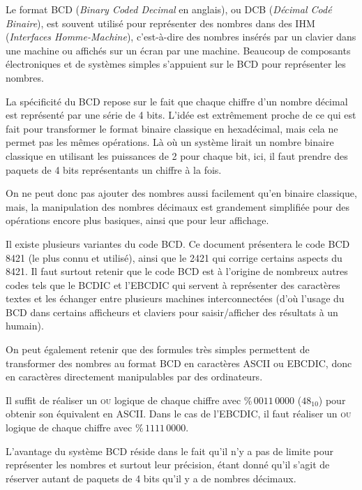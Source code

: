 \documentclass[11pt,a4paper]{article}
\begin{document}
\bigskip

Le format BCD (\textit{Binary Coded Decimal} en anglais), ou DCB (\textit{Décimal Codé Binaire}), est souvent utilisé pour représenter des nombres dans des IHM (\textit{Interfaces Homme-Machine}), c'est-à-dire des nombres insérés par un clavier dans une machine ou affichés sur un écran par une machine.
Beaucoup de composants électroniques et de systèmes simples s'appuient sur le BCD pour représenter les nombres.

\medskip

La spécificité du BCD repose sur le fait que chaque chiffre d'un nombre décimal est représenté par une série de 4 bits.
L'idée est extrêmement proche de ce qui est fait pour transformer le format binaire classique en hexadécimal, mais cela ne permet pas les mêmes opérations.
Là où un système lirait un nombre binaire classique en utilisant les puissances de 2 pour chaque bit, ici, il faut prendre des paquets de 4 bits représentants un chiffre à la fois.

On ne peut donc pas ajouter des nombres aussi facilement qu'en binaire classique, mais, la manipulation des nombres décimaux est grandement simplifiée pour des opérations encore plus basiques, ainsi que pour leur affichage.

\bigskip

Il existe plusieurs variantes du code BCD.
Ce document présentera le code BCD 8421 (le plus connu et utilisé), ainsi que le 2421 qui corrige certains aspects du 8421.
Il faut surtout retenir que le code BCD est à l'origine de nombreux autres codes tels que le BCDIC et l'EBCDIC qui servent à représenter des caractères textes et les échanger entre plusieurs machines interconnectées (d'où l'usage du BCD dans certains afficheurs et claviers pour saisir/afficher des résultats à un humain).

\medskip

On peut également retenir que des formules très simples permettent de transformer des nombres au format BCD en caractères ASCII ou EBCDIC, donc en caractères directement manipulables par des ordinateurs.

Il suffit de réaliser un \textsc{ou} logique de chaque chiffre avec $ \text{\%} \, 0011 \, 0000 $ ($48_{10}$) pour obtenir son équivalent en ASCII.
Dans le cas de l'EBCDIC, il faut réaliser un \textsc{ou} logique de chaque chiffre avec $ \text{\%} \, 1111 \, 0000 $.

\bigskip

L'avantage du système BCD réside dans le fait qu'il n'y a pas de limite pour représenter les nombres et surtout leur précision, étant donné qu'il s'agit de réserver autant de paquets de 4 bits qu'il y a de nombres décimaux.
\end{document}
